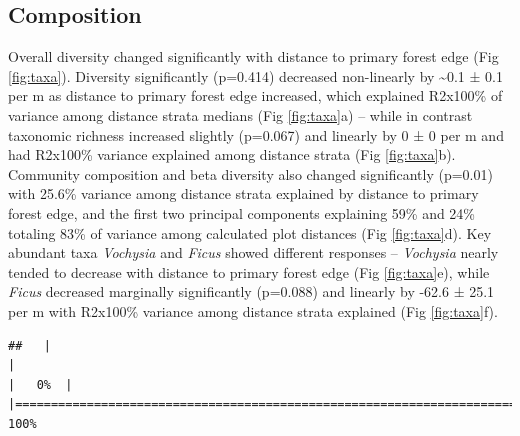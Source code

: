 \documentclass[
  12pt,
]{article}
\begin{document}
\hypertarget{composition}{%
\subsection{Composition}\label{composition}}

Overall diversity changed significantly with distance to primary forest edge
(Fig \ref{fig:taxa}).
Diversity significantly
(p=0.414)
decreased non-linearly by
\textasciitilde0.1 ±
0.1 per m
as distance to primary forest edge increased,
which explained
R2x100\% of variance
among distance strata medians
(Fig \ref{fig:taxa}a) --
while in contrast taxonomic richness increased slightly
(p=0.067)
and linearly
by
0 ±
0 per m
and had R2x100\% variance explained
among distance strata
(Fig \ref{fig:taxa}b).
Community composition and beta diversity also changed significantly
(p=0.01) with
25.6\%
variance among distance strata explained by distance to primary forest edge,
and the first two principal components explaining
59\% and
24\% totaling
83\%
of variance among calculated plot distances
(Fig \ref{fig:taxa}d).
Key abundant taxa \emph{Vochysia} and \emph{Ficus} showed different responses -- \emph{Vochysia} nearly tended to decrease with distance to primary forest edge
(Fig \ref{fig:taxa}e),
while \emph{Ficus} decreased marginally significantly
(p=0.088)
and linearly by
-62.6 ±
25.1 per m
with R2x100\% variance among distance strata explained
(Fig \ref{fig:taxa}f).

\begin{verbatim}
##   |                                                                              |                                                                      |   0%  |                                                                              |======================================================================| 100%
\end{verbatim}
\end{document}
